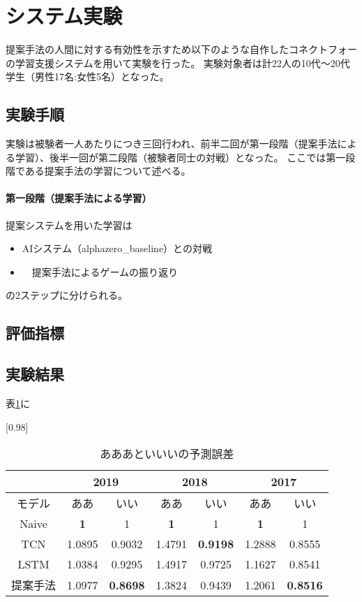 \section{システム実験}
提案手法の人間に対する有効性を示すため以下のような自作したコネクトフォーの学習支援システムを用いて実験を行った。
実験対象者は計22人の10代～20代学生（男性17名:女性5名）となった。
\subsection{実験手順}
実験は被験者一人あたりにつき三回行われ、前半二回が第一段階（提案手法による学習）、後半一回が第二段階（被験者同士の対戦）となった。
ここでは第一段階である提案手法の学習について述べる。
\paragraph{第一段階（提案手法による学習）}
提案システムを用いた学習は
\begin{itemize}
	\item AIシステム（alphazero\_baseline）との対戦
	\item　提案手法によるゲームの振り返り
\end{itemize}
の2ステップに分けられる。
\subsection{評価指標}


\subsection{実験結果}
表\ref{table:result-1}に

\begin{comment}
	また，ああああああ
\end{comment}

\begin{table}[H]
	\caption{あああといいいの予測誤差}
	\centering
	\scalebox{0.98}[0.98]{
		\begin{tabular}{c|c|c|c|c|c|c}
			\multicolumn{1}{c}{} & \multicolumn{2}{|c|}{2019} 
			& \multicolumn{2}{c|}{2018} & \multicolumn{2}{c}{2017}\\ \hline \hline
			モデル    & ああ & いい & ああ & いい & ああ & いい \\ \hline
			Naive    & \bf{1} & 1 & \bf{1} & 1 & \bf{1} & 1 \\
			TCN      & 1.0895 & 0.9032 & 1.4791 & \bf{0.9198} & 1.2888 & 0.8555 \\
			LSTM     & 1.0384 & 0.9295 & 1.4917 & 0.9725 & 1.1627 & 0.8541 \\
			提案手法  & 1.0977 & \bf{0.8698} & 1.3824 & 0.9439 & 1.2061 & \bf{0.8516} \\
		\end{tabular}
	}
	\label{table:result-1}
\end{table}
